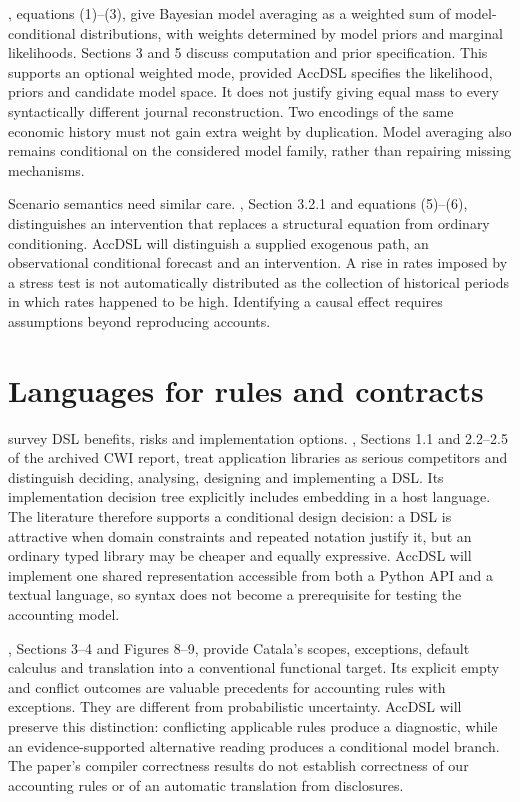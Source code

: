 \citet{hoeting1999}, equations (1)--(3), give Bayesian model averaging as a
weighted sum of model-conditional distributions, with weights determined by
model priors and marginal likelihoods. Sections 3 and 5 discuss computation
and prior specification. This supports an optional weighted mode, provided
AccDSL specifies the likelihood, priors and candidate model space. It does
not justify giving equal mass to every syntactically different journal
reconstruction. Two encodings of the same economic history must not gain extra
weight by duplication. Model averaging also remains conditional on the
considered model family, rather than repairing missing mechanisms.

Scenario semantics need similar care. \citet{pearl2009}, Section 3.2.1 and
equations (5)--(6), distinguishes an intervention that replaces a structural
equation from ordinary conditioning. AccDSL will distinguish a supplied
exogenous path, an observational conditional forecast and an intervention.
A rise in rates imposed by a stress test is not automatically distributed as
the collection of historical periods in which rates happened to be high.
Identifying a causal effect requires assumptions beyond reproducing accounts.

\section{Languages for rules and contracts}

\citet{vandeursen2000} survey DSL benefits, risks and implementation options.
\citet{mernik2005}, Sections 1.1 and 2.2--2.5 of the archived CWI report,
treat application libraries as serious competitors and distinguish deciding,
analysing, designing and implementing a DSL. Its implementation decision tree
explicitly includes embedding in a host language. The literature therefore
supports a conditional design decision: a DSL is attractive when domain
constraints and repeated notation justify it, but an ordinary typed library
may be cheaper and equally expressive. AccDSL will implement one shared
representation accessible from both a Python API and a textual language, so
syntax does not become a prerequisite for testing the accounting model.

\citet{merigoux2021}, Sections 3--4 and Figures 8--9, provide Catala's scopes,
exceptions, default calculus and translation into a conventional functional
target. Its explicit empty and conflict outcomes are valuable precedents for
accounting rules with exceptions. They are different from probabilistic
uncertainty. AccDSL will preserve this distinction: conflicting applicable
rules produce a diagnostic, while an evidence-supported alternative reading
produces a conditional model branch. The paper's compiler correctness results
do not establish correctness of our accounting rules or of an automatic
translation from disclosures.

